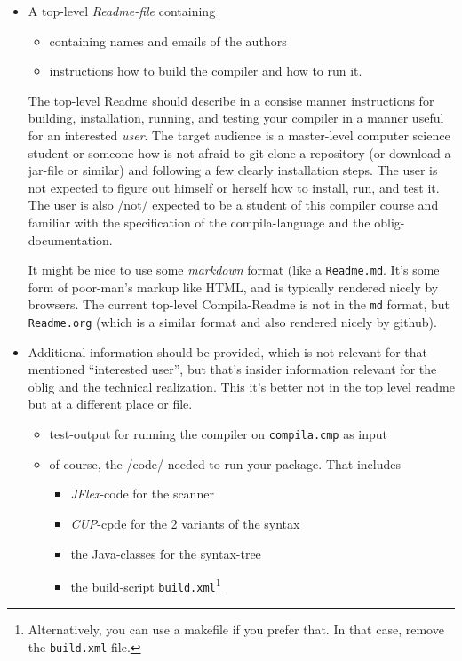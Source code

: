 \documentclass[10pt,freeform]{handout}[2014/08/13]
\begin{document}
\begin{itemize}
\item A top-level \emph{Readme-file} containing
  \begin{itemize}
  \item containing names and emails of the authors
  \item instructions how to build the compiler and how to run it.
  \end{itemize}
  The top-level Readme should describe in a consise manner instructions for
  building, installation, running, and testing your compiler in a manner
  useful for an interested \emph{user}. The target audience is a
  master-level computer science student or someone how is not afraid to
  git-clone a repository (or download a jar-file or similar) and following
  a few clearly installation steps. The user is not expected to figure out
  himself or herself how to install, run, and test it. The user is also
  /not/ expected to be a student of this compiler course and familiar with
  the specification of the compila-language and the oblig-documentation.

  It might be nice to use some \emph{markdown} format (like a
  \texttt{Readme.md}. It's some form of poor-man's markup like HTML, and is
  typically rendered nicely by browsers. The current top-level
  Compila-Readme is not in the \texttt{md} format, but \texttt{Readme.org}
  (which is a similar format and also rendered nicely by github).
  
\item Additional information should be provided, which is not relevant for
  that mentioned ``interested user'', but that's insider information
  relevant for the oblig and the technical realization. This it's better
  not in the top level readme but at a different place or file. 
  \begin{itemize}
  \item test-output for running the compiler on \texttt{compila.cmp} as
    input
  \item of course, the /code/ needed to run your package. That includes
    \begin{itemize}
    \item \textsl{JFlex}-code for the scanner
    \item \textsl{CUP}-cpde for the 2 variants of the syntax
    \item the Java-classes for the syntax-tree
    \item the build-script \texttt{build.xml}\footnote{Alternatively, you
        can use a makefile if you prefer that. In that case, remove the
        \texttt{build.xml}-file.}
    \end{itemize}
  \end{itemize}
\end{itemize}
\end{document}
